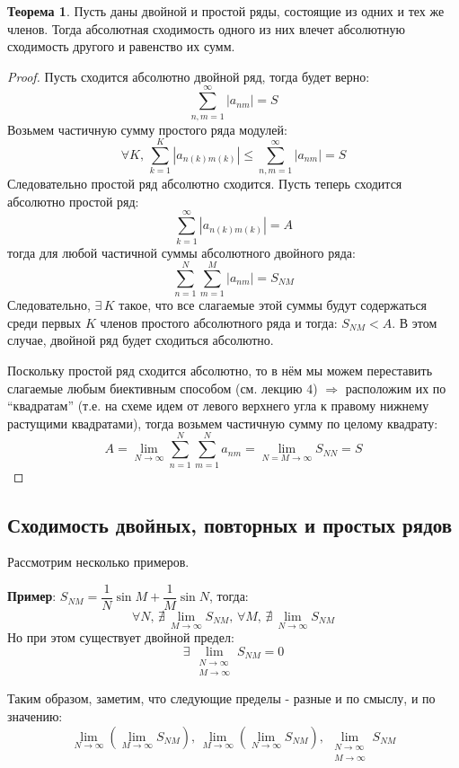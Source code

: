 \documentclass[12pt]{article}
\theoremstyle{definition}
\newtheorem{theorem}{Теорема}
\newcommand{\ddsum}[2]{\displaystyle\sum\limits_{#1}^{#2}}
\begin{document}
\begin{theorem}
	Пусть даны двойной и простой ряды, состоящие из одних и тех же членов. Тогда абсолютная сходимость одного из них влечет абсолютную сходимость другого и равенство их сумм.
\end{theorem}
\begin{proof}
	Пусть сходится абсолютно двойной ряд, тогда будет верно:
	$$
		\ddsum{n,m = 1}{\infty}|a_{nm}| = S
	$$
	Возьмем частичную сумму простого ряда модулей:
	$$
		\forall K, \, \ddsum{k = 1}{K}|a_{n(k)m(k)}| \leq \ddsum{n,m = 1}{\infty}|a_{nm}| = S
	$$
	Следовательно простой ряд абсолютно сходится. Пусть теперь сходится абсолютно простой ряд:
	$$
		\ddsum{k = 1}{\infty}|a_{n(k)m(k)}| = A
	$$
	тогда для любой частичной суммы абсолютного двойного ряда:
	$$
		\ddsum{n = 1}{N}\ddsum{m = 1}{M}|a_{nm}| = S_{NM}
	$$
	Следовательно, $\exists \, K$ такое, что все слагаемые этой суммы будут содержаться среди первых $K$ членов простого абсолютного ряда и тогда: $S_{NM} < A$. В этом случае, двойной ряд будет сходиться абсолютно. 
	
	Поскольку простой ряд сходится абсолютно, то в нём мы можем переставить слагаемые любым биективным способом (см. лекцию $4$) $\Rightarrow$ расположим их по ``квадратам'' (т.е. на схеме идем от левого верхнего угла к правому нижнему растущими квадратами), тогда возьмем частичную сумму по целому квадрату:
	$$
		A = \lim\limits_{N \to \infty}\ddsum{n = 1}{N}\ddsum{m = 1}{N}a_{nm} = \lim\limits_{N = M \to \infty} S_{NN} = S
	$$
\end{proof}
\newpage
\subsection*{Сходимость двойных, повторных и простых рядов}
Рассмотрим несколько примеров.

\textbf{Пример}: $S_{NM} = \dfrac{1}{N}\sin{M} + \dfrac{1}{M}\sin{N}$, тогда:
$$
	\forall N, \, \nexists \, \lim\limits_{M \to \infty} S_{NM},\, \forall M, \, \nexists \, \lim\limits_{N\to \infty} S_{NM}
$$
Но при этом существует двойной предел:
$$
	\exists \, \lim\limits_{\substack{N \to \infty \\ M \to \infty}} S_{NM} = 0
$$

Таким образом, заметим, что следующие пределы - разные и по смыслу, и по значению:
$$
	\lim\limits_{N \to \infty}\left(\lim\limits_{M \to \infty} S_{NM}\right), \, \lim\limits_{M \to \infty}\left(\lim\limits_{N \to \infty} S_{NM}\right), \, \lim\limits_{\substack{N \to \infty \\ M \to \infty}} S_{NM}
$$
\end{document}
